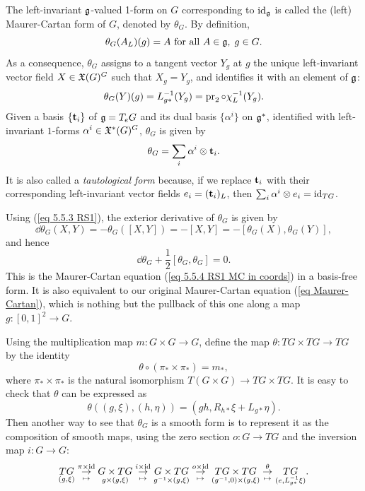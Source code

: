 \begin{defn}
    The left-invariant $\frakg$-valued 1-form on $G$ corresponding to $\id_\frakg$ is called the (left) Maurer-Cartan form of $G$, denoted by $\theta_G$. By definition,
    \[\theta_G(A_L)(g)=A\text{ for all }A\in\frakg,\; g\in G.\]
    As a consequence, $\theta_G$ assigns to a tangent vector $Y_g$ at $g$ the unique left-invariant vector field $X\in\fX(G)^G$ such that $X_g=Y_g$, and identifies it with an element of $\frakg$:
    \[\theta_G(Y)(g)=L_{g\ast}^{-1}(Y_g)=\pr_2\circ \chi_L^{-1}(Y_g).\]
    Given a basis $\{\bf{t}_i\}$ of $\frakg=T_eG$ and its dual basis $\{\alpha^i\}$ on $\frakg^\ast$, identified with left-invariant $1$-forms $\alpha^i\in\fX^\ast(G)^G$, $\theta_G$ is given by
    \[\theta_G=\sum_i \alpha^i\otimes \bf{t}_i.\]
    It is also called a \emph{tautological form} because, if we replace $\bf{t}_i$ with their corresponding left-invariant vector fields $e_i=(\bf{t}_i)_L$, then $\sum_i \alpha^i\otimes e_i=\id_{TG}$.

    Using (\ref{eq 5.5.3 RS1}), the exterior derivative of $\theta_G$ is given by
    \[\dd\theta_G(X,Y)=-\theta_G([X,Y])=-[X,Y]=-[\theta_G(X),\theta_G(Y)],\]
    and hence
    \[\dd\theta_G +\frac12 [\theta_G,\theta_G]=0.\label{eq 5.5.10 RS1 maurer-cartan}\]
    This is the Maurer-Cartan equation (\ref{eq 5.5.4 RS1 MC in coords}) in a basis-free form. It is also equivalent to our original Maurer-Cartan equation (\ref{eq Maurer-Cartan}), which is nothing but the pullback of this one along a map $g:[0,1]^2\to G$. 
\end{defn}

\begin{rem}
    Using the multiplication map $m:G\times G\to G$, define the map $\theta:TG\times TG\to TG$ by the identity
    \[\theta\circ (\pi_\ast\times \pi_\ast)=m_\ast,\]
    where $\pi_\ast\times \pi_\ast$ is the natural isomorphism $T(G\times G)\to TG\times TG$. It is easy to check that $\theta$ can be expressed as
    \[\theta\left((g,\xi),(h,\eta)\right)=(gh,R_{h\ast}\xi+L_{g\ast}\eta).\label{eq m_ast}\]
    Then another way to see that $\theta_G$ is a smooth form is to represent it as the composition of smooth maps, using the zero section $o:G\to TG$ and the inversion map $i:G\to G$:
    \[\underset{(g,\xi)}{TG}
    \underset{\mapsto}{\overset{\pi\times\id}{\to}}
    \underset{g\times (g,\xi)}{G\times TG}
    \underset{\mapsto}{\overset{i\times\id}{\to}}
    \underset{g^{-1}\times (g,\xi)}{G\times TG}
    \underset{\mapsto}{\overset{o\times\id}{\to}}
    \underset{(g^{-1},0)\times (g,\xi)}{TG\times TG}
    \underset{\mapsto}{\overset{\theta}{\to}}
    \underset{(e,L_{g\ast}^{-1}\xi)}{TG}.\label{eq MC form as composition}
    \]
\end{rem}

